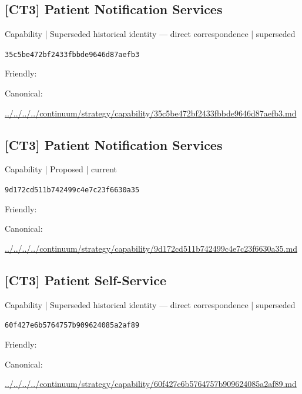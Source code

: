 \documentclass[10pt,a4paper]{article}
\begin{document}
\subsection*{[CT3] Patient Notification Services}
{\small Capability | Superseded historical identity — direct correspondence | superseded}\par
\texttt{35c5be472bf2433fbbde9646d87aefb3}\par
Friendly: \par
Canonical: \par
{\footnotesize\url{../../../../continuum/strategy/capability/35c5be472bf2433fbbde9646d87aefb3.md}}\par
\subsection*{[CT3] Patient Notification Services}
{\small Capability | Proposed | current}\par
\texttt{9d172cd511b742499c4e7c23f6630a35}\par
Friendly: \par
Canonical: \par
{\footnotesize\url{../../../../continuum/strategy/capability/9d172cd511b742499c4e7c23f6630a35.md}}\par
\subsection*{[CT3] Patient Self-Service}
{\small Capability | Superseded historical identity — direct correspondence | superseded}\par
\texttt{60f427e6b5764757b909624085a2af89}\par
Friendly: \par
Canonical: \par
{\footnotesize\url{../../../../continuum/strategy/capability/60f427e6b5764757b909624085a2af89.md}}\par
\end{document}

